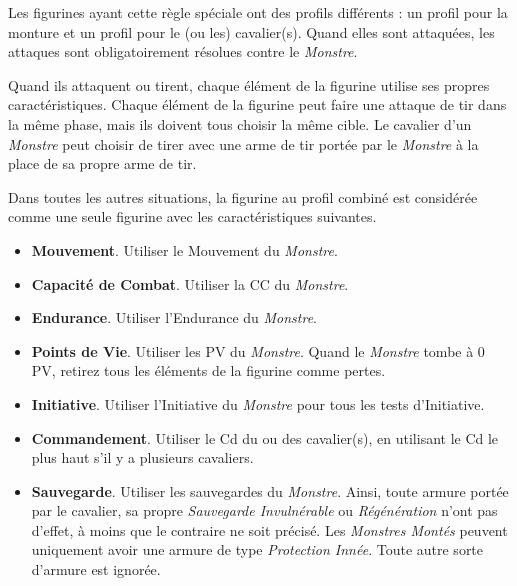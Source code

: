 Les figurines ayant cette règle spéciale ont des profils différents : un profil pour la monture et un profil pour le (ou les) cavalier(s). Quand elles sont attaquées, les attaques sont obligatoirement résolues contre le \emph{Monstre}.

Quand ils attaquent ou tirent, chaque élément de la figurine utilise ses propres caractéristiques. Chaque élément de la figurine peut faire une attaque de tir dans la même phase, mais ils doivent tous choisir la même cible. Le cavalier d'un \emph{Monstre} peut choisir de tirer avec une arme de tir portée par le \emph{Monstre} à la place de sa propre arme de tir.

Dans toutes les autres situations, la figurine au profil combiné est considérée comme une seule figurine avec les caractéristiques suivantes. 


\begin{itemize}[label={-}]
\item \textbf{Mouvement}. Utiliser le Mouvement du \emph{Monstre}.
\item \textbf{Capacité de Combat}. Utiliser la CC du \emph{Monstre}.
\item \textbf{Endurance}. Utiliser l'Endurance du \emph{Monstre}.
\item \textbf{Points de Vie}. Utiliser les PV du \emph{Monstre}. Quand le \emph{Monstre} tombe à 0 PV, retirez tous les éléments de la figurine comme pertes.
\item \textbf{Initiative}. Utiliser l'Initiative du \emph{Monstre} pour tous les tests d'Initiative.
\item \textbf{Commandement}. Utiliser le Cd du ou des cavalier(s), en utilisant le Cd le plus haut s'il y a plusieurs cavaliers.
\item \textbf{Sauvegarde}. Utiliser les sauvegardes du \emph{Monstre}. Ainsi, toute armure portée par le cavalier, sa propre \emph{Sauvegarde Invulnérable} ou \emph{Régénération} n'ont pas d'effet, à moins que le contraire ne soit précisé. Les \emph{Monstres Montés} peuvent uniquement avoir une armure de type \emph{Protection Innée}. Toute autre sorte d'armure est ignorée.
\end{itemize}


\subsubsection*{}

